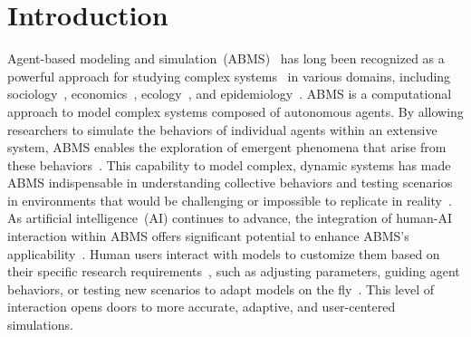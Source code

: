 \section{Introduction}

Agent-based modeling and simulation~(ABMS)~\cite{1574234} has long been recognized as a powerful approach for studying complex systems~\cite{gilbert2004agent} in various domains, including sociology~\cite{annurev:/content/journals/10.1146/annurev.soc.28.110601.141117,gilbert_how_2000}, economics~\cite{hamill2015agent, LENGNICK2013102}, ecology~\cite{MCLANE20111544}, and epidemiology~\cite{el-sayed_social_2012}.
ABMS is a computational approach to model complex systems composed of autonomous agents.
By allowing researchers to simulate the behaviors of individual agents within an extensive system, ABMS enables the exploration of emergent phenomena that arise from these behaviors~\cite{AN201225}.
This capability to model complex, dynamic systems has made ABMS indispensable in understanding collective behaviors and testing scenarios in environments that would be challenging or impossible to replicate in reality~\cite{heath2009}.
As artificial intelligence~(AI) continues to advance, the integration of human-AI interaction within ABMS offers significant potential to enhance ABMS's applicability~\cite{doi:10.1177/0037549706073695,berryman2008review}.
Human users interact with models to customize them based on their specific research requirements~\cite{netlogo}, such as adjusting parameters, guiding agent behaviors, or testing new scenarios to adapt models on the fly~\cite{10.1145/3613904.3642545,10.1145/3490099.3511105}.
This level of interaction opens doors to more accurate, adaptive, and user-centered simulations.


